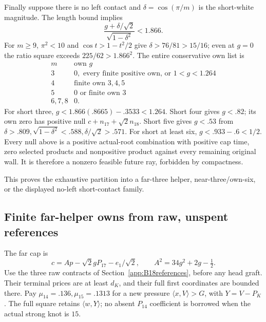 \documentclass[11pt]{article}
\theoremstyle{definition}
\theoremstyle{remark}
\newcommand{\ip}[2]{\langle #1,#2\rangle}
\begin{document}
Finally suppose there is no left contact and
\(\delta=\cos(\pi/m)\) is the short-white magnitude.
The length bound implies
\[
 \frac{g+\delta/\sqrt2}{\sqrt{1-\delta^2}}<1.866 .
\]
For \(m\geq9\), \(\pi^2<10\) and
\(\cos t>1-t^2/2\) give \(\delta>76/81>15/16\);
even at \(g=0\) the ratio square exceeds
\(225/62>1.866^2\). The entire conservative own list is
\[
\begin{array}{c|l}
m&\text{own }g\\ \hline
3&0,\text{ every finite positive own, or }1<g<1.264\\
4&\text{finite own }3,4,5\\
5&0\text{ or finite own }3\\
6,7,8&0 .
\end{array}
\]
For short three,
\(g<1.866(.8665)-.3533<1.264\).
Short four gives \(g<.82\); its own zero has positive null
\(c+n_{17}+\sqrt2n_{18}\).
Short five gives \(g<.53\) from
\(\delta>.809,\sqrt{1-\delta^2}<.588,\delta/\sqrt2>.571\).
For short at least six, \(g<.933-.6<1/2\).
Every null above is a positive actual-root combination with
positive cap time, zero selected products and nonpositive product
against every remaining original wall. It is therefore a nonzero
feasible future ray, forbidden by compactness.

This proves the exhaustive partition into a far-three helper,
near-three/own-six, or the displayed no-left short-contact family.

\subsection{Finite far-helper owns from raw, unspent references}
\label{app:B18finitefar}
The far cap is
\[
 c=A p-\sqrt2gP_{17}-e_1/\sqrt2,\qquad
 A^2=34g^2+2g-\tfrac12.
\]
Use the three raw contracts of Section~\ref{app:B18references},
before any head graft. Their terminal prices are at least
\(d_K\), and their full first coordinates are bounded there.
Pay \(\mu_{14}=.136,\mu_{15}=.1313\) for a new pressure
\(\ip xV>G\), with \(Y=V-P_K\).
The full square retains \(\ip wY\); no absent \(P_{14}\)
coefficient is borrowed when the actual strong knot is \(15\).
\end{document}
